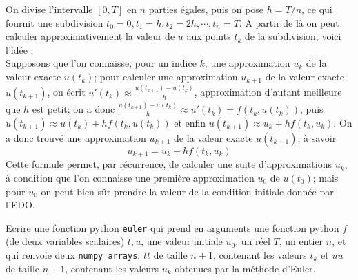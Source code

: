 \documentclass{exam}
\begin{document}
\begin{questions}
On divise l'intervalle $[0, T]$ en $n$ parties égales, puis on pose $h=T/n$, ce qui fournit une subdivision $t_0 = 0, t_1 = h, t_2 = 2h, \cdots, t_n = T$. A partir de là on peut calculer approximativement la valeur de $u$ aux points $t_k$ de la subdivision; voici l'idée :\\
Supposons que l'on connaisse, pour un indice $k$, une approximation $u_k$ de la valeur exacte $u(t_k)$; pour calculer une approximation $u_{k+1}$ de la valeur exacte $u(t_{k+1})$, on écrit $u'(t_k) \approx \frac{u(t_{k+1})-u(t_k)}{h}$, approximation d'autant meilleure que $h$ est petit;
 on a donc 
 $\frac{u(t_{k+1})-u(t_k)}{h} \approx u'(t_k) = f(t_k, u(t_k))$, puis $u(t_{k+1}) \approx u(t_k) + hf(t_k, u(t_k))$
  et enfin 
  $u(t_{k+1}) \approx u_k + hf(t_k, u_k)$. On a donc trouvé une approximation $u_{k+1}$ de la valeur exacte $u(t_{k+1})$, à savoir 
\begin{equation}
\label{euler}
u_{k+1} = u_k + hf(t_k, u_k)
\end{equation}
Cette formule permet, par récurrence, de calculer une suite d'approximations $u_k$, à condition que l'on connaisse une première approximation $u_0$ de $u(t_0)$; mais pour $u_0$ on peut bien sûr prendre la valeur de la condition initiale donnée par l'EDO.

\question
Ecrire une fonction python \texttt{euler} qui prend en arguments une fonction python $f$ (de deux variables scalaires) $t, u$, une valeur initiale $u_0$, un réel $T$, un entier $n$, et qui renvoie deux \texttt{numpy arrays}:  $tt$ de taille $n+1$, contenant les valeurs $t_k$ et $uu$ de taille $n+1$, contenant les valeurs $u_k$ obtenues par la méthode d'Euler.
\question
{}
\end{questions}
\end{document}
